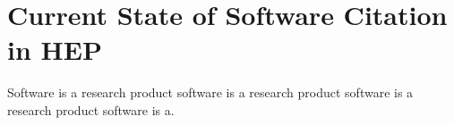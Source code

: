 \section{Current State of Software Citation in HEP}\label{sec:current_state}

Software is a research product software is a research product software is a research product software is a.
